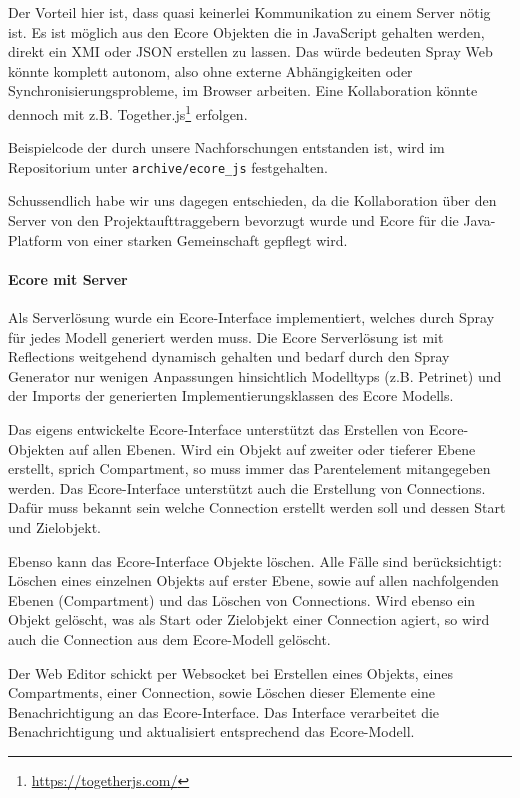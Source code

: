 Der Vorteil hier ist, dass quasi keinerlei Kommunikation zu einem Server nötig ist.
Es ist möglich aus den Ecore Objekten die in JavaScript gehalten werden,
direkt ein XMI oder JSON erstellen zu lassen.
Das würde bedeuten Spray Web könnte komplett autonom, also ohne externe
Abhängigkeiten oder Synchronisierungsprobleme, im Browser arbeiten.
Eine Kollaboration könnte dennoch mit z.B.
Together.js\footnote{\url{https://togetherjs.com/}} erfolgen.

Beispielcode der durch unsere Nachforschungen entstanden ist, wird im Repositorium
unter {\tt archive/ecore\_js} festgehalten.

Schussendlich habe wir uns dagegen entschieden, da die Kollaboration
über den Server von den Projektaufttraggebern bevorzugt wurde und
Ecore für die Java-Platform von einer starken Gemeinschaft gepflegt wird.

\paragraph{Ecore mit Server}
Als Serverlösung wurde ein Ecore-Interface implementiert, welches durch Spray
für jedes Modell generiert werden muss. Die Ecore Serverlösung ist mit Reflections weitgehend
dynamisch gehalten und bedarf durch den Spray Generator nur wenigen Anpassungen hinsichtlich
Modelltyps (z.B. Petrinet) und der Imports der generierten Implementierungsklassen des Ecore Modells.

Das eigens entwickelte Ecore-Interface unterstützt das Erstellen von Ecore-Objekten auf allen Ebenen.
Wird ein Objekt auf zweiter oder tieferer Ebene erstellt, sprich Compartment, so muss immer das Parentelement
mitangegeben werden. Das Ecore-Interface unterstützt auch die Erstellung von Connections. Dafür muss
bekannt sein welche Connection erstellt werden soll und dessen Start und Zielobjekt.

Ebenso kann das Ecore-Interface Objekte löschen. Alle Fälle sind berücksichtigt: Löschen eines einzelnen Objekts
auf erster Ebene, sowie auf allen nachfolgenden Ebenen (Compartment) und das Löschen von Connections. Wird ebenso 
ein Objekt gelöscht, was als Start oder Zielobjekt einer Connection agiert, so wird auch die Connection aus dem
Ecore-Modell gelöscht.

Der Web Editor schickt per Websocket bei Erstellen eines Objekts, eines Compartments, einer
Connection, sowie Löschen dieser Elemente eine Benachrichtigung an das Ecore-Interface. Das Interface verarbeitet
die Benachrichtigung und aktualisiert entsprechend das Ecore-Modell.

